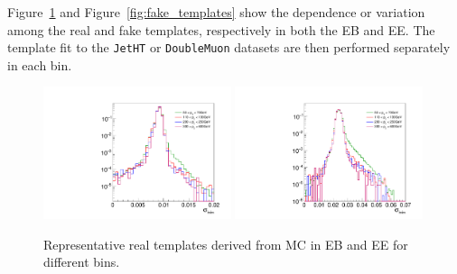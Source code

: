Figure~\ref{fig:real_templates} and Figure~\ref{fig:fake_templates} show the \pt dependence or variation among the real and fake templates, respectively in both the EB and EE. The template fit to the \texttt{JetHT} or \texttt{DoubleMuon} datasets are then performed separately in each \pt bin.

\begin{figure}[!htbp]
\centering
\includegraphics[width=0.49\textwidth]{fig/realtemplatecompEB_2018.pdf}
\includegraphics[width=0.49\textwidth]{fig/realtemplatecompEE_2018.pdf}
\caption{Representative real templates derived from MC in EB and EE for different \pt bins.}
\label{fig:real_templates}
\end{figure}

